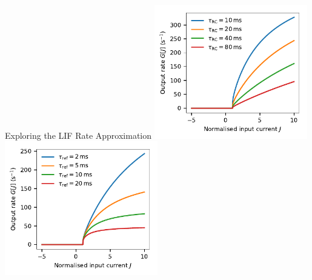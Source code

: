 \documentclass[handout,aspectratio=169]{beamer}
\begin{document}
\begin{frame}{Exploring the LIF Rate Approximation}
	\centering
	\includegraphics[width=0.5\textwidth]{media/lif_neuron_rate_tau_rc.pdf}%
	\includegraphics[width=0.5\textwidth]{media/lif_neuron_rate_tau_ref.pdf}
\end{frame}
\end{document}

